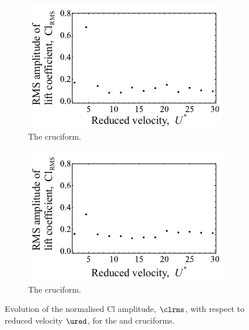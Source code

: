 \documentclass[a4paper,fleqn]{cas-sc}
\begin{document}
\begin{figure}
  \centering
  \begin{subfigure}[h]{0.4\textwidth}
    \includegraphics[width=\textwidth]{figs/clRMS4}
    \caption{The \angfo{} cruciform.}
    \label{fig:clRMS4}
  \end{subfigure}
  \hspace{6mm}
  \begin{subfigure}[h]{0.4\textwidth}
    \includegraphics[width=\textwidth]{figs/clRMS3}
    \caption{The \angth{} cruciform.}
    \label{fig:clRMS3}
  \end{subfigure}

  \label{fig:clRMS43}
  \caption{Evolution of the normalised Cl \rms{} amplitude, $\clrms$, with respect to reduced velocity $\ured$, for the \angfo{} and \angth{} cruciforms.}
\end{figure}
\end{document}
